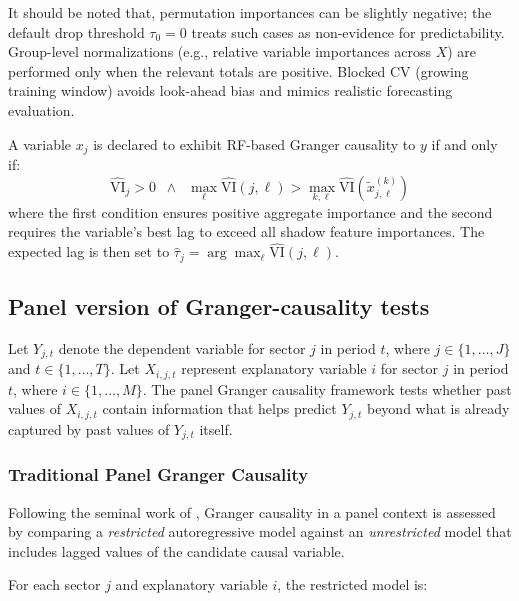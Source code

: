 \documentclass[preprint, 3p,
authoryear]{elsarticle} %
\begin{document}
It should be noted that, permutation importances can be slightly
negative; the default drop threshold \(\tau_0=0\) treats such cases as
non-evidence for predictability. Group-level normalizations (e.g.,
relative variable importances across \(X\)) are performed only when the
relevant totals are positive. Blocked CV (growing training window)
avoids look-ahead bias and mimics realistic forecasting evaluation.

A variable \(x_j\) is declared to exhibit RF-based Granger causality to
\(y\) if and only if: \begin{equation}
\boxed{
\widehat{\text{VI}}_j > 0 \;\;\wedge\;\; 
\max_{\ell} \widehat{\text{VI}}(j,\ell) > 
\max_{k,\ell} \widehat{\text{VI}}(\widetilde{x}_{j,\ell}^{(k)})
}
\label{eq:rf_decision}
\end{equation} where the first condition ensures positive aggregate
importance and the second requires the variable's best lag to exceed all
shadow feature importances. The expected lag is then set to
\(\widehat{\tau}_j = \arg\max_{\ell} \widehat{\text{VI}}(j,\ell)\).

\subsection{Panel version of Granger-causality tests}\label{sec:pgc}

Let \(Y_{j,t}\) denote the dependent variable for sector \(j\) in period
\(t\), where \(j \in \{1,\ldots,J\}\) and \(t \in \{1,\ldots,T\}\). Let
\(X_{i,j,t}\) represent explanatory variable \(i\) for sector \(j\) in
period \(t\), where \(i \in \{1,\ldots,M\}\). The panel Granger
causality framework tests whether past values of \(X_{i,j,t}\) contain
information that helps predict \(Y_{j,t}\) beyond what is already
captured by past values of \(Y_{j,t}\) itself.

\subsubsection{Traditional Panel Granger Causality}\label{sec:tpgc}

Following the seminal work of \citet{granger1969}, Granger causality in
a panel context \citep{holtz-eakin1988, dumitrescu2012} is assessed by
comparing a \emph{restricted} autoregressive model against an
\emph{unrestricted} model that includes lagged values of the candidate
causal variable.

For each sector \(j\) and explanatory variable \(i\), the restricted
model is:
\end{document}
